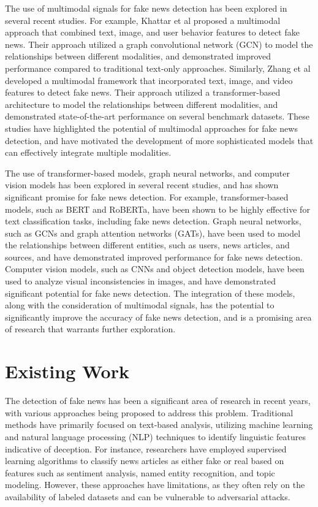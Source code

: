 \documentclass[conference]{IEEEtran}
\begin{document}
The use of multimodal signals for fake news detection has been explored in several recent studies. For example, Khattar et al proposed a multimodal approach that combined text, image, and user behavior features to detect fake news. Their approach utilized a graph convolutional network (GCN) to model the relationships between different modalities, and demonstrated improved performance compared to traditional text-only approaches. Similarly, Zhang et al developed a multimodal framework that incorporated text, image, and video features to detect fake news. Their approach utilized a transformer-based architecture to model the relationships between different modalities, and demonstrated state-of-the-art performance on several benchmark datasets. These studies have highlighted the potential of multimodal approaches for fake news detection, and have motivated the development of more sophisticated models that can effectively integrate multiple modalities.

The use of transformer-based models, graph neural networks, and computer vision models has been explored in several recent studies, and has shown significant promise for fake news detection. For example, transformer-based models, such as BERT and RoBERTa, have been shown to be highly effective for text classification tasks, including fake news detection. Graph neural networks, such as GCNs and graph attention networks (GATs), have been used to model the relationships between different entities, such as users, news articles, and sources, and have demonstrated improved performance for fake news detection. Computer vision models, such as CNNs and object detection models, have been used to analyze visual inconsistencies in images, and have demonstrated significant potential for fake news detection. The integration of these models, along with the consideration of multimodal signals, has the potential to significantly improve the accuracy of fake news detection, and is a promising area of research that warrants further exploration.

\section{Existing Work}
The detection of fake news has been a significant area of research in recent years, with various approaches being proposed to address this problem. Traditional methods have primarily focused on text-based analysis, utilizing machine learning and natural language processing (NLP) techniques to identify linguistic features indicative of deception. For instance, researchers have employed supervised learning algorithms to classify news articles as either fake or real based on features such as sentiment analysis, named entity recognition, and topic modeling. However, these approaches have limitations, as they often rely on the availability of labeled datasets and can be vulnerable to adversarial attacks.
\end{document}
